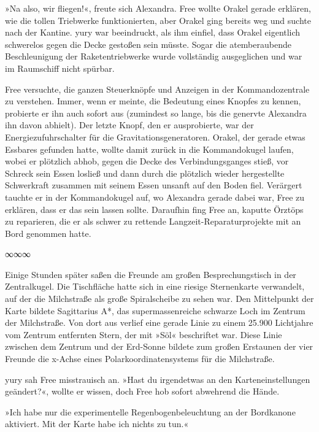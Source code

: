 »Na also, wir fliegen!«, freute sich Alexandra. Free wollte Orakel gerade erklären, wie die tollen Triebwerke funktionierten, aber Orakel ging bereits weg und suchte nach der Kantine. yury war beeindruckt, als ihm einfiel, dass Orakel eigentlich schwerelos gegen die Decke gestoßen sein müsste. Sogar die atemberaubende Beschleunigung der Raketentriebwerke wurde vollständig ausgeglichen und war im Raumschiff nicht spürbar.

Free versuchte, die ganzen Steuerknöpfe und Anzeigen in der Kommandozentrale zu verstehen. Immer, wenn er meinte, die Bedeutung eines Knopfes zu kennen, probierte er ihn auch sofort aus (zumindest so lange, bis die genervte Alexandra ihn davon abhielt). Der letzte Knopf, den er ausprobierte, war der Energiezufuhrschalter für die Gravitationsgeneratoren. Orakel, der gerade etwas Essbares gefunden hatte, wollte damit zurück in die Kommandokugel laufen, wobei er plötzlich abhob, gegen die Decke des Verbindungsganges stieß, vor Schreck sein Essen losließ und dann durch die plötzlich wieder hergestellte Schwerkraft zusammen mit seinem Essen unsanft auf den Boden fiel. Verärgert tauchte er in der Kommandokugel auf, wo Alexandra gerade dabei war, Free zu erklären, dass er das sein lassen sollte. Daraufhin fing Free an, kaputte Örztöps zu reparieren, die er als schwer zu rettende Langzeit-Reparaturprojekte mit an Bord genommen hatte.

\begin{center}
    ∞∞∞
\end{center}

Einige Stunden später saßen die Freunde am großen Besprechungstisch in der Zentralkugel. Die Tischfläche hatte sich in eine riesige Sternenkarte verwandelt, auf der die Milchstraße als große Spiralscheibe zu sehen war. Den Mittelpunkt der Karte bildete Sagittarius A*, das supermassenreiche schwarze Loch im Zentrum der Milchstraße. Von dort aus verlief eine gerade Linie zu einem 25.900 Lichtjahre vom Zentrum entfernten Stern, der mit »Söl« beschriftet war. Diese Linie zwischen dem Zentrum und der Erd-Sonne bildete zum großen Erstaunen der vier Freunde die x-Achse eines Polarkoordinatensystems für die Milchstraße.

yury sah Free misstrauisch an. »Hast du irgendetwas an den Karteneinstellungen geändert?«, wollte er wissen, doch Free hob sofort abwehrend die Hände.

»Ich habe nur die experimentelle Regenbogenbeleuchtung an der Bordkanone aktiviert. Mit der Karte habe ich nichts zu tun.«


